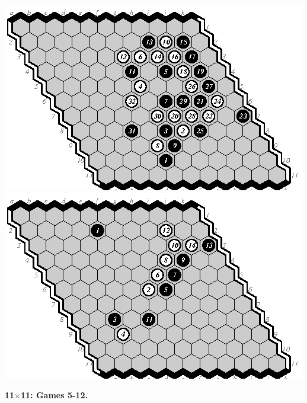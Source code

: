 \documentclass{icga}
\begin{document}
\includegraphics[scale=1.3]{11e-d.eps}\hspace*{-1cm}\includegraphics[scale=1.3]{12d-m.eps}

{\bf 11$\times$11: Games 5-12.}
\end{document}
